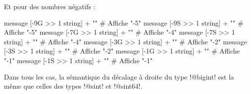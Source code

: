 Et pour des nombres négatifs :

\begin{galgas}
  message [-9G >> 1 string] + "\n" # Affiche "-5"
  message [-9S >> 1 string] + "\n" # Affiche "-5"
  message [-7G >> 1 string] + "\n" # Affiche "-4"
  message [-7S >> 1 string] + "\n" # Affiche "-4"
  message [-3G >> 1 string] + "\n" # Affiche "-2"
  message [-3S >> 1 string] + "\n" # Affiche "-2"
  message [-1G >> 1 string] + "\n" # Affiche "-1"
  message [-1S >> 1 string] + "\n" # Affiche "-1"
\end{galgas}

Dans tous les cas, la sémantique du décalage à droite du type \ggs!@bigint! est la même que celles des types \ggs!@sint! et \ggs!@sint64!.
